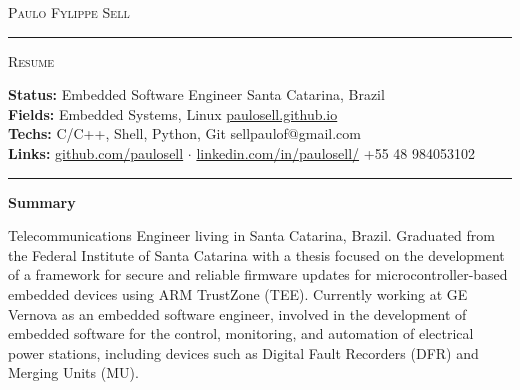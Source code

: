 \documentclass[10pt,A4]{article}
\newcommand{\sectionspace}{
	\vspace{0.1cm}
}
\newcommand{\cvsection}[1]
{
	\begin{center}
		\large\textcolor{sectcol}{\textbf{#1}}
	\end{center}
	\sectionspace
}
\newcommand{\metasection}[2]
{
\footnotesize{#2} \hspace*{\fill} \footnotesize{#1}\\[1pt]
}
\begin{document}
\pagestyle{fancy}	








\vspace{-8pt}
\begin{center}
	\HUGE \textsc{Paulo Fylippe Sell} \textcolor{sectcol}{\rule[-1mm]{1mm}{0.9cm}} \textsc{Resume}\\[2pt]
	
\end{center}



\vspace{6pt}


\metasection{Santa Catarina, Brazil}{\textbf{Status:} Embedded Software Engineer}
\metasection{\href{https://paulosell.github.io}{paulosell.github.io}}{\textbf{Fields:} Embedded Systems, Linux}
\metasection{sellpaulof@gmail.com}{\textbf{Techs:} C/C++, Shell, Python, Git}
\metasection{+55 48 984053102}{\textbf{Links:} \href{https://github.com/paulosell}{github.com/paulosell} $\cdot$ \href{https://www.linkedin.com/in/paulosell/}{linkedin.com/in/paulosell/}} 
\vspace{-2pt}
\textcolor{softcol}{\hrule}
\vspace{6pt}

\normalsize

\vspace{-6pt}
\cvsection{Summary}
Telecommunications Engineer living in Santa Catarina, Brazil. Graduated from the Federal Institute of Santa Catarina with a thesis focused on the development of a framework for secure and reliable firmware updates for microcontroller-based embedded devices using ARM TrustZone (TEE). Currently working at GE Vernova as an embedded software engineer, involved in the development of embedded software for the control, monitoring, and automation of electrical power stations, including devices such as Digital Fault Recorders (DFR) and Merging Units (MU).\\
\end{document}
